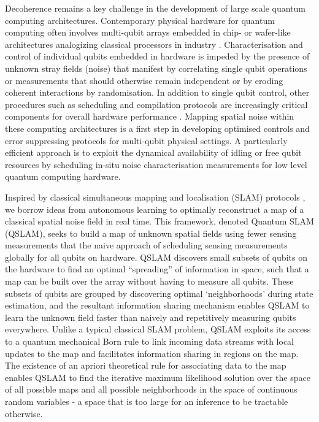 Decoherence remains a key challenge in the development of large scale quantum computing architectures. Contemporary physical hardware for quantum computing often involves multi-qubit arrays embedded in chip- or wafer-like architectures analogizing classical processors in industry \cite{yao2012scalable,monroe2014large,veldhorst2017silicon,jones2012layered,kielpinski2002architecture,franke2019rent}. Characterisation and control of individual qubits embedded in hardware is impeded by the presence of unknown stray fields (noise) that manifest by correlating single qubit operations or measurements that should otherwise remain independent or by eroding coherent interactions by randomisation. In addition to single qubit control, other procedures such as scheduling and compilation protocols are increasingly critical components for overall hardware performance \cite{venturelli2018compiling,murali2019noise,shi2019optimized,venturelli2018optimization,tannu2018case}. Mapping spatial noise within these computing architectures is a first step in developing optimised controls and error suppressing protocols for multi-qubit physical settings. A particularly efficient approach is to exploit the dynamical availability of idling or free qubit resources by scheduling in-situ noise characterisation measurements for low level quantum computing hardware. 

Inspired by classical simultaneous mapping and localisation (SLAM) protocols \cite{cadena2016past,bergman1999recursive,stachniss2014particle,durrant2006simultaneous,bailey2006simultaneous,murphy2000bayesian,howard2006multi,thrun2005probabilistic,thrun1998probabilistic}, we borrow ideas from autonomous learning to optimally reconstruct a map of a classical spatial noise field in real time. This framework, denoted Quantum SLAM (QSLAM), seeks to build a map of unknown spatial fields using fewer sensing measurements that the naive approach of scheduling sensing measurements globally for all qubits on hardware. QSLAM  discovers small subsets of qubits on the hardware to find an optimal “spreading” of information in space, such that a map can be built over the array without having to measure all qubits. These subsets of qubits are grouped by discovering optimal `neighborhoods' during state estimation, and the resultant information sharing mechanism enables QSLAM to learn the unknown field faster than naively and repetitively measuring qubits everywhere. Unlike a typical classical SLAM problem, QSLAM exploits its access to a quantum mechanical Born rule to link incoming data streams with local updates to the map and facilitates information sharing in regions on the map. The existence of an apriori theoretical rule for associating data to the map enables QSLAM to find the iterative maximum likelihood solution over the space of all possible maps and all possible neighborhoods in the space of continuous random variables - a space that is too large for an inference to be tractable otherwise. 

